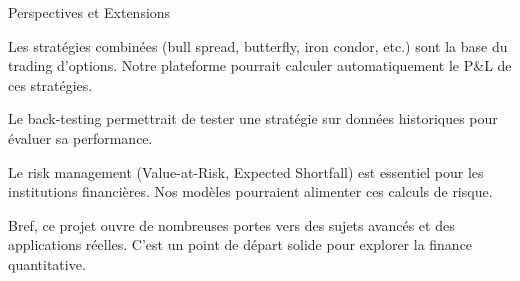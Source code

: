 \documentclass[aspectratio=169, 10pt]{beamer}
\begin{document}
\begin{frame}{Perspectives et Extensions}
{        Les stratégies combinées (bull spread, butterfly, iron condor, etc.)
        sont la base du trading d'options. Notre plateforme pourrait
        calculer automatiquement le P&L de ces stratégies.
        
        Le back-testing permettrait de tester une stratégie sur données historiques
        pour évaluer sa performance.
        
        Le risk management (Value-at-Risk, Expected Shortfall) est essentiel
        pour les institutions financières. Nos modèles pourraient alimenter
        ces calculs de risque.
        
        Bref, ce projet ouvre de nombreuses portes vers des sujets avancés
        et des applications réelles. C'est un point de départ solide
        pour explorer la finance quantitative.
    }
\end{frame}
\end{document}
